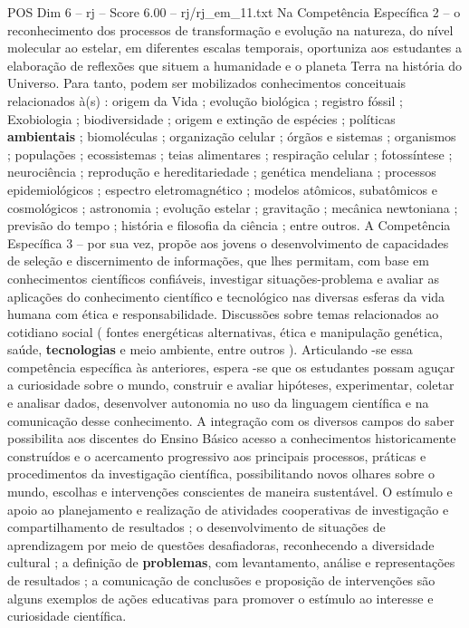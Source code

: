 \begin{textsample}{POS Dim 6 – rj – Score 6.00 – rj/rj\_em\_11.txt}
Na Competência Específica 2 – o reconhecimento dos processos de transformação e evolução na natureza, do nível molecular ao estelar, em diferentes escalas temporais, oportuniza aos estudantes a elaboração de reflexões que situem a humanidade e o planeta Terra na história do Universo.
Para tanto, podem ser mobilizados conhecimentos conceituais relacionados à(s) : origem da Vida ; evolução biológica ; registro fóssil ; Exobiologia ; biodiversidade ; origem e extinção de espécies ; políticas \textbf{ambientais} ; biomoléculas ; organização celular ; órgãos e sistemas ; organismos ; populações ; ecossistemas ; teias alimentares ; respiração celular ; fotossíntese ; neurociência ; reprodução e hereditariedade ; genética mendeliana ; processos epidemiológicos ; espectro eletromagnético ; modelos atômicos, subatômicos e cosmológicos ; astronomia ; evolução estelar ; gravitação ; mecânica newtoniana ; previsão do tempo ; história e filosofia da ciência ; entre outros.
A Competência Específica 3 – por sua vez, propõe aos jovens o desenvolvimento de capacidades de seleção e discernimento de informações, que lhes permitam, com base em conhecimentos científicos confiáveis, investigar situações-problema e avaliar as aplicações do conhecimento científico e tecnológico nas diversas esferas da vida humana com ética e responsabilidade.
Discussões sobre temas relacionados ao cotidiano social ( fontes energéticas alternativas, ética e manipulação genética, saúde, \textbf{tecnologias} e meio ambiente, entre outros ).
Articulando -se essa competência específica às anteriores, espera -se que os estudantes possam aguçar a curiosidade sobre o mundo, construir e avaliar hipóteses, experimentar, coletar e analisar dados, desenvolver autonomia no uso da linguagem científica e na comunicação desse conhecimento.
A integração com os diversos campos do saber possibilita aos discentes do Ensino Básico acesso a conhecimentos historicamente construídos e o acercamento progressivo aos principais processos, práticas e procedimentos da investigação científica, possibilitando novos olhares sobre o mundo, escolhas e intervenções conscientes de maneira sustentável.
O estímulo e apoio ao planejamento e realização de atividades cooperativas de investigação e compartilhamento de resultados ; o desenvolvimento de situações de aprendizagem por meio de questões desafiadoras, reconhecendo a diversidade cultural ; a definição de \textbf{problemas}, com levantamento, análise e representações de resultados ; a comunicação de conclusões e proposição de intervenções são alguns exemplos de ações educativas para promover o estímulo ao interesse e curiosidade científica.

\end{textsample}
